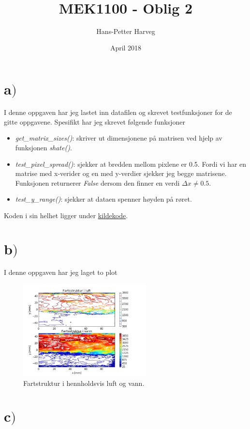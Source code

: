 \documentclass{article}
\title{MEK1100 - Oblig 2}
\author{Hans-Petter Harveg}
\date{April 2018}
\begin{document}
\maketitle

\section*{a$)$}

I denne oppgaven har jeg lastet inn datafilen og skrevet testfunksjoner for de gitte oppgavene. Spesifikt har jeg skrevet følgende funksjoner
\begin{itemize}
\item \textit{get\_matrix\_sizes()}: skriver ut dimensjonene på matrisen ved hjelp av funksjonen \textit{shate()}.
\item \textit{test\_pixel\_spread()}: sjekker at bredden mellom pixlene er 0.5. Fordi vi har en matrise med x-verider og en med y-verdier sjekker jeg begge matrisene. Funksjonen returnerer \textit{False} dersom den finner en verdi $\Delta x \neq 0.5$.
\item \textit{test\_y\_range()}: sjekker at dataen spenner høyden på røret.
\end{itemize}
Koden i sin helhet ligger under \hyperlink{sourcecode}{kildekode}.

\section*{b$)$}

I denne oppgaven har jeg laget to plot
\begin{figure}[H]
\centering
\includegraphics[width=0.6\textwidth]{problem_b}
\caption{Fartstruktur i hennholdsvis luft og vann.}
\label{fig:problem_b_contour_fig}
\end{figure}

\section*{c$)$}
\end{document}
